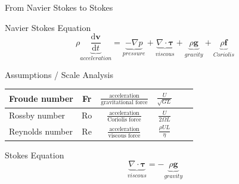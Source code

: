 \documentclass[hide notes,intlimits,unknownkeysallowed]{beamer}
\begin{document}
\begin{frame}{From Navier Stokes to Stokes}
  \begin{block}{Navier Stokes Equation}
  \begin{equation}
    \rho \underbrace{\frac{\textrm{d} {\bm{v}}}{\textrm{d} t}}_{acceleration} =  \underbrace{-\nabla p}_{pressure} +  \underbrace{\nabla \cdot \bm{\tau}}_{viscous}  + \underbrace{\rho\bm{g}}_{gravity} + \underbrace{\rho\bm{f}}_{Coriolis}
  \end{equation}
  \end{block}
  \begin{block}{Assumptions / Scale Analysis}\vspace{0.5em}
\begin{tabular}{lccccc}
\hline
Froude number & Fr & $\frac{\text{acceleration}}{\text{gravitational force}}$ & $\frac{U}{\sqrt{GL}}$ \\[.25em]
\hline
Rossby number & Ro & $\frac{\text{acceleration}}{\text{Coriolis force}}$ & $\frac{U}{2 \Omega L}$   \\[.25em]
\hline
Reynolds number & Re & $\frac{\text{acceleration}}{\text{viscous force}}$ & $\frac{\rho U L}{\eta}$ \\[.25em]
\hline
\end{tabular}        
  \end{block}
  \begin{block}{Stokes Equation}
\begin{equation}
  \underbrace{\nabla \cdot \bm{\tau}}_{viscous} = - \underbrace{\rho\bm{g}}_{gravity}
\end{equation}
  \end{block}
\end{frame}
\end{document}

